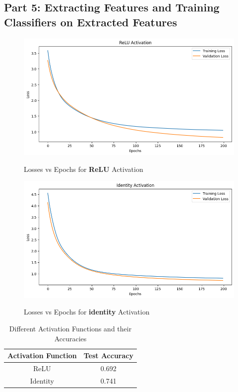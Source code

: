 \documentclass{article}
\begin{document}
\subsection*{Part 5: Extracting Features and Training Classifiers on Extracted Features}
\begin{figure}[H] %
    \centering
    \begin{minipage}{0.49\linewidth}
        \centering
        \includegraphics[width=\linewidth]{assets/5-relu.png}
        \caption{Losses vs Epochs for \textbf{ReLU} Activation}{}
        \label{fig:b-1}
    \end{minipage}
    \hfill
    \begin{minipage}{0.49\linewidth}
        \centering
        \includegraphics[width=\linewidth]{assets/5-identity.png}
        \caption{Losses vs Epochs for \textbf{identity} Activation}{}
        \label{fig:b-2}
    \end{minipage}
\end{figure}

\begin{table}[H]
    \centering
    \begin{tabular}{|c|c|}
        \hline
        \textbf{Activation Function} & \textbf{Test Accuracy}\\ \hline
        ReLU & 0.692\\ \hline
        Identity & 0.741\\ \hline
    \end{tabular}
    \caption{Different Activation Functions and their Accuracies}
\end{table}
\end{document}
